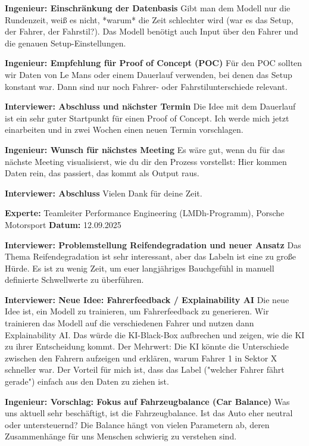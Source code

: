 \textbf{Ingenieur: Einschränkung der Datenbasis}
Gibt man dem Modell nur die Rundenzeit, weiß es nicht, *warum* die Zeit schlechter wird (war es das Setup, der Fahrer, der Fahrstil?). Das Modell benötigt auch Input über den Fahrer und die genauen Setup-Einstellungen.

\textbf{Ingenieur: Empfehlung für Proof of Concept (POC)}
Für den POC sollten wir Daten von Le Mans oder einem Dauerlauf verwenden, bei denen das Setup konstant war. Dann sind nur noch Fahrer- oder Fahrstilunterschiede relevant.

\textbf{Interviewer: Abschluss und nächster Termin}
Die Idee mit dem Dauerlauf ist ein sehr guter Startpunkt für einen Proof of Concept. Ich werde mich jetzt einarbeiten und in zwei Wochen einen neuen Termin vorschlagen.

\textbf{Ingenieur: Wunsch für nächstes Meeting}
Es wäre gut, wenn du für das nächste Meeting visualisierst, wie du dir den Prozess vorstellst: Hier kommen Daten rein, das passiert, das kommt als Output raus.

\textbf{Interviewer: Abschluss}
Vielen Dank für deine Zeit.

\pagebreak
\nolinenumbers

\label{transkript-meeting2}

\textbf{Experte:} Teamleiter Performance Engineering (LMDh-Programm), Porsche Motorsport
\textbf{Datum:} 12.09.2025

\setcounter{linenumber}{1}
\linenumbers

\textbf{Interviewer: Problemstellung Reifendegradation und neuer Ansatz}
Das Thema Reifendegradation ist sehr interessant, aber das Labeln ist eine zu große Hürde. Es ist zu wenig Zeit, um euer langjähriges Bauchgefühl in manuell definierte Schwellwerte zu überführen.

\textbf{Interviewer: Neue Idee: Fahrerfeedback / Explainability AI}
Die neue Idee ist, ein Modell zu trainieren, um Fahrerfeedback zu generieren. Wir trainieren das Modell auf die verschiedenen Fahrer und nutzen dann Explainability AI. Das würde die KI-Black-Box aufbrechen und zeigen, wie die KI zu ihrer Entscheidung kommt. Der Mehrwert: Die KI könnte die Unterschiede zwischen den Fahrern aufzeigen und erklären, warum Fahrer 1 in Sektor X schneller war. Der Vorteil für mich ist, dass das Label ("welcher Fahrer fährt gerade") einfach aus den Daten zu ziehen ist.

\textbf{Ingenieur: Vorschlag: Fokus auf Fahrzeugbalance (Car Balance)}
Was uns aktuell sehr beschäftigt, ist die Fahrzeugbalance. Ist das Auto eher neutral oder untersteuernd? Die Balance hängt von vielen Parametern ab, deren Zusammenhänge für uns Menschen schwierig zu verstehen sind.

